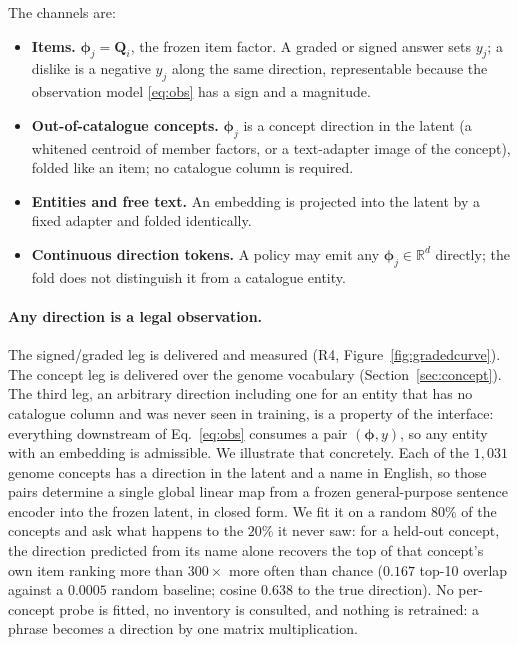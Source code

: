 \documentclass[acmsmall,review,anonymous]{acmart}
\newcommand{\R}{\mathbb{R}}
\newcommand{\Q}{\mathbf{Q}}
\newcommand{\bphi}{\boldsymbol{\phi}}
\begin{document}
The channels are:
\begin{itemize}[leftmargin=1.4em,itemsep=1.5pt]
  \item \textbf{Items.} $\bphi_j=\Q_i$, the frozen item factor. A graded or signed answer sets $y_j$; a dislike is a negative $y_j$ along the same direction, representable because the observation model \eqref{eq:obs} has a sign and a magnitude.
  \item \textbf{Out-of-catalogue concepts.} $\bphi_j$ is a concept direction in the latent (a whitened centroid of member factors, or a text-adapter image of the concept), folded like an item; no catalogue column is required.
  \item \textbf{Entities and free text.} An embedding is projected into the latent by a fixed adapter and folded identically.
  \item \textbf{Continuous direction tokens.} A policy may emit any $\bphi_j\in\R^{d}$ directly; the fold does not distinguish it from a catalogue entity.
\end{itemize}

\paragraph{Any direction is a legal observation.} The signed/graded leg is delivered and measured (R4, Figure~\ref{fig:gradedcurve}). The concept leg is delivered over the genome vocabulary (Section~\ref{sec:concept}). The third leg, an arbitrary direction including one for an entity that has no catalogue column and was never seen in training, is a property of the interface: everything downstream of Eq.~\eqref{eq:obs} consumes a pair $(\bphi,y)$, so any entity with an embedding is admissible. We illustrate that concretely. Each of the $1{,}031$ genome concepts has a direction in the latent and a name in English, so those pairs determine a single global linear map from a frozen general-purpose sentence encoder into the frozen latent, in closed form. We fit it on a random $80\%$ of the concepts and ask what happens to the $20\%$ it never saw: for a held-out concept, the direction predicted from its name alone recovers the top of that concept's own item ranking more than $300\times$ more often than chance ($0.167$ top-10 overlap against a $0.0005$ random baseline; cosine $0.638$ to the true direction). No per-concept probe is fitted, no inventory is consulted, and nothing is retrained: a phrase becomes a direction by one matrix multiplication.
\end{document}
